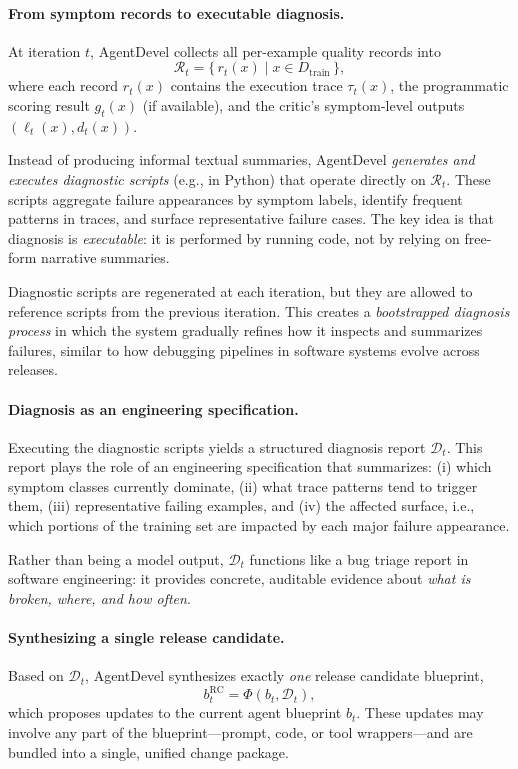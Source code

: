 \documentclass[11pt]{article}
\begin{document}
\paragraph{From symptom records to executable diagnosis.}
At iteration $t$, AgentDevel collects all per-example quality records into
\begin{equation}
\mathcal{R}_t = \{\, r_t(x) \mid x \in D_{\text{train}} \,\},
\end{equation}
where each record $r_t(x)$ contains the execution trace $\tau_t(x)$, the programmatic scoring result $g_t(x)$ (if available), and the critic’s symptom-level outputs $(\ell_t(x), d_t(x))$.

Instead of producing informal textual summaries, AgentDevel \emph{generates and executes diagnostic scripts} (e.g., in Python) that operate directly on $\mathcal{R}_t$. These scripts aggregate failure appearances by symptom labels, identify frequent patterns in traces, and surface representative failure cases. The key idea is that diagnosis is \emph{executable}: it is performed by running code, not by relying on free-form narrative summaries.

Diagnostic scripts are regenerated at each iteration, but they are allowed to reference scripts from the previous iteration. This creates a \emph{bootstrapped diagnosis process} in which the system gradually refines how it inspects and summarizes failures, similar to how debugging pipelines in software systems evolve across releases.

\paragraph{Diagnosis as an engineering specification.}
Executing the diagnostic scripts yields a structured diagnosis report $\mathcal{D}_t$. This report plays the role of an engineering specification that summarizes:
(i) which symptom classes currently dominate,
(ii) what trace patterns tend to trigger them,
(iii) representative failing examples, and
(iv) the affected surface, i.e., which portions of the training set are impacted by each major failure appearance.

Rather than being a model output, $\mathcal{D}_t$ functions like a bug triage report in software engineering: it provides concrete, auditable evidence about \emph{what is broken, where, and how often}.

\paragraph{Synthesizing a single release candidate.}
Based on $\mathcal{D}_t$, AgentDevel synthesizes exactly \emph{one} release candidate blueprint,
\begin{equation}
b_t^{\mathrm{RC}} = \Phi(b_t, \mathcal{D}_t),
\end{equation}
which proposes updates to the current agent blueprint $b_t$. These updates may involve any part of the blueprint—prompt, code, or tool wrappers—and are bundled into a single, unified change package.
\end{document}
